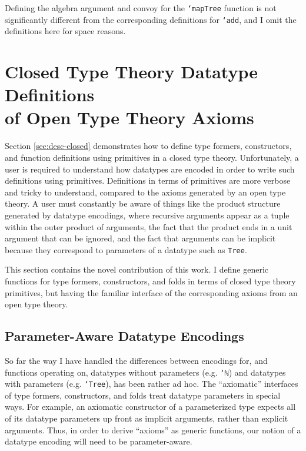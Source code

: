 \documentclass[runningheads,a4paper]{llncs}
\newcommand{\refsec}[1]{Section \ref{sec:#1}}
\begin{document}
Defining the algebra argument and convoy for the {\tt `mapTree}
function is not significantly different from the corresponding
definitions for {\tt `add}, and I omit the definitions here for space
reasons.

\section{Closed Type Theory Datatype Definitions
  \\of Open Type Theory Axioms}
\label{sec:generic}

\refsec{desc-closed} demonstrates how to define type formers,
constructors, and function definitions using primitives in a closed
type theory. Unfortunately, a user is required to understand how
datatypes are encoded in order to write such definitions using
primitives. Definitions in terms of primitives are more verbose and
tricky to understand, compared to the axioms generated by an open type
theory. A user must constantly be aware of things like the product
structure generated by datatype encodings, where recursive arguments
appear as a tuple within the outer product of arguments, the fact that the product ends in a unit
argument that can be ignored, and the fact that arguments can be implicit
because they correspond to parameters of a datatype such as
{\tt Tree}.

This section contains the novel contribution of this work. I define
generic functions for type formers, constructors, and folds in terms
of closed type theory primitives, but having the familiar interface of
the corresponding axioms from an open type theory.

\subsection{Parameter-Aware Datatype Encodings}

So far the way I have handled the differences between encodings for, and
functions operating on, datatypes without parameters (e.g. {\tt `ℕ})
and datatypes with parameters (e.g. {\tt `Tree}), has been rather
ad hoc. The ``axiomatic'' interfaces of type formers, constructors, and
folds treat datatype parameters in special ways. For example, an
axiomatic constructor of a parameterized type expects all of its
datatype parameters up front as implicit arguments, rather than
explicit arguments. Thus, in order to derive ``axioms'' as generic
functions, our notion of a datatype encoding will need to be
parameter-aware. 
\end{document}
